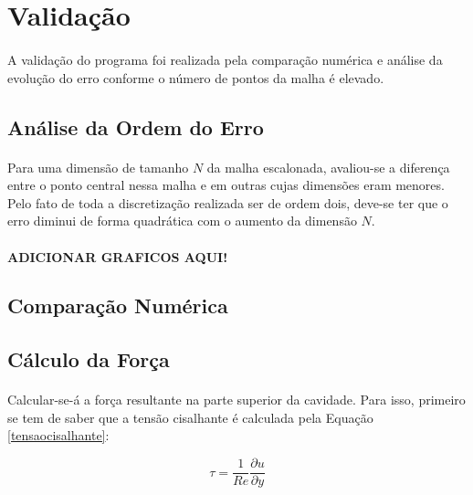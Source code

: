 \documentclass[validacao.tex]{subfiles}
\begin{document}
\section{Validação}
\paragraph{} A validação do programa foi realizada pela comparação numérica e análise da evolução do erro conforme o número de pontos da malha é elevado.

\subsection{Análise da Ordem do Erro}
\paragraph{} Para uma dimensão de tamanho $N$ da malha escalonada, avaliou-se a diferença entre o ponto central nessa malha e em outras cujas dimensões eram menores. Pelo fato de toda a discretização realizada ser de ordem dois, deve-se ter que o erro diminui de forma quadrática com o aumento da dimensão $N$.

\paragraph{ADICIONAR GRAFICOS AQUI!}

\subsection{Comparação Numérica}

\paragraph{} 

\subsection{Cálculo da Força}

\paragraph{} Calcular-se-á a força resultante na parte superior da cavidade. Para isso, primeiro se tem de saber que a tensão cisalhante é calculada pela Equação \ref{tensaocisalhante}:

\begin{equation}
\tau = \frac{1}{\mathit{Re}} \frac{\partial u}{\partial y}\label{tensaocisalhante}
\end{equation}
\end{document}

